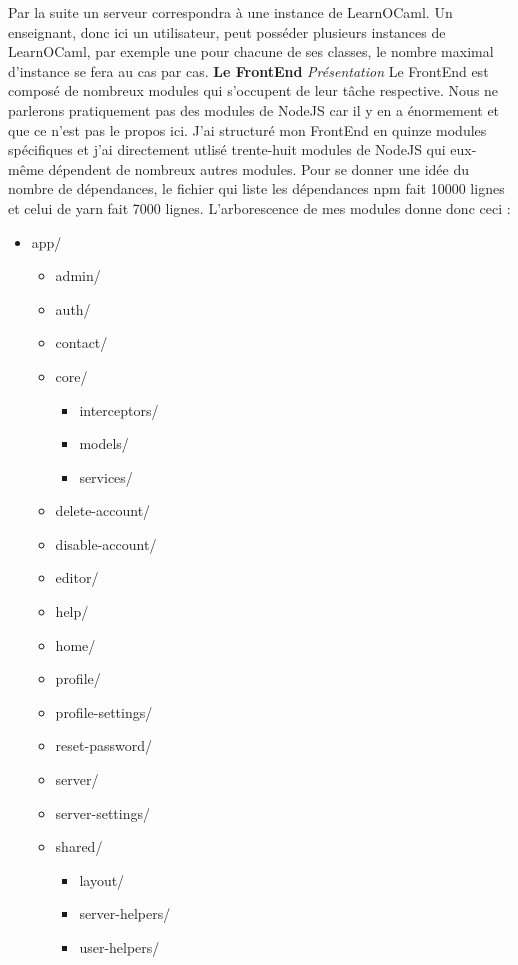 \documentclass{article}
\begin{document}
\newline
\newline
Par la suite un serveur correspondra à une instance de LearnOCaml. Un enseignant, donc ici un utilisateur, peut posséder plusieurs instances de LearnOCaml, par exemple une pour chacune de ses classes, le nombre maximal d'instance se fera au cas par cas.
\newpage
\textbf{Le FrontEnd}
\newline
\newline
\textit{Présentation}
\newline
\newline
Le FrontEnd est composé de nombreux modules qui s'occupent de leur tâche respective. Nous ne parlerons pratiquement pas des modules de NodeJS car il y en a énormement et que ce n'est pas le propos ici.
\newline
J'ai structuré mon FrontEnd en quinze modules spécifiques et j'ai directement utlisé trente-huit modules de NodeJS qui eux-même dépendent de nombreux autres modules.
\newline
Pour se donner une idée du nombre de dépendances, le fichier qui liste les dépendances npm fait 10000 lignes et celui de yarn fait 7000 lignes.
\newline
L'arborescence de mes modules donne donc ceci :
\begin{itemize}
	\item[] app/
	\begin{itemize}
		\item[]admin/
		\item[]auth/
		\item[]contact/
		\item[]core/
		\begin{itemize}
			\item[]interceptors/
			\item[]models/
			\item[]services/
		\end{itemize}
		\item[]delete-account/
		\item[]disable-account/
		\item[]editor/
		\item[]help/
		\item[]home/
		\item[]profile/
		\item[]profile-settings/
		\item[]reset-password/
		\item[]server/
		\item[]server-settings/
		\item[]shared/
		\begin{itemize}
			\item[]layout/
			\item[]server-helpers/
			\item[]user-helpers/
		\end{itemize}
	\end{itemize}
\end{itemize}
\end{document}
